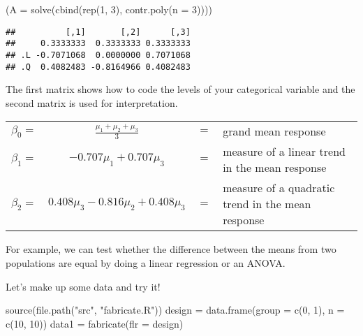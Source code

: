 \documentclass[
]{book}
\newenvironment{Shaded}{\begin{snugshade}}{\end{snugshade}}
\newcommand{\AttributeTok}[1]{\textcolor[rgb]{0.77,0.63,0.00}{#1}}
\newcommand{\DecValTok}[1]{\textcolor[rgb]{0.00,0.00,0.81}{#1}}
\newcommand{\FunctionTok}[1]{\textcolor[rgb]{0.00,0.00,0.00}{#1}}
\newcommand{\NormalTok}[1]{#1}
\newcommand{\OtherTok}[1]{\textcolor[rgb]{0.56,0.35,0.01}{#1}}
\newcommand{\StringTok}[1]{\textcolor[rgb]{0.31,0.60,0.02}{#1}}
\begin{document}
\begin{Shaded}
\begin{Highlighting}[]
\NormalTok{(}\AttributeTok{A =} \FunctionTok{solve}\NormalTok{(}\FunctionTok{cbind}\NormalTok{(}\FunctionTok{rep}\NormalTok{(}\DecValTok{1}\NormalTok{, }\DecValTok{3}\NormalTok{), }\FunctionTok{contr.poly}\NormalTok{(}\AttributeTok{n =} \DecValTok{3}\NormalTok{))))}
\end{Highlighting}
\end{Shaded}

\begin{verbatim}
##          [,1]       [,2]      [,3]
##     0.3333333  0.3333333 0.3333333
## .L -0.7071068  0.0000000 0.7071068
## .Q  0.4082483 -0.8164966 0.4082483
\end{verbatim}

The first matrix shows how to code the levels of your categorical
variable and the second matrix is used for interpretation.

\begin{tabularx}{\textwidth}{r c c X}
\(\beta_0 =\) &\(\tfrac{\mu_1+\mu_2+\mu_3}{3}\) &\(=\) &grand mean response \\
\(\beta_1 =\) &\(-0.707\mu_1 + 0.707\mu_3\) &\(=\) &measure of a linear trend in the mean response \\
\(\beta_2 =\) &\(0.408 \mu_3 - 0.816 \mu_2 + 0.408 \mu_3\) &\(=\) &measure of a quadratic trend in the mean response
\end{tabularx}

For example, we can test whether the difference between the means from
two populations are equal by doing a linear regression or an ANOVA.

Let's make up some data and try it!

\begin{Shaded}
\begin{Highlighting}[]
\FunctionTok{source}\NormalTok{(}\FunctionTok{file.path}\NormalTok{(}\StringTok{"src"}\NormalTok{, }\StringTok{"fabricate.R"}\NormalTok{))}
\NormalTok{design }\OtherTok{=} \FunctionTok{data.frame}\NormalTok{(}\AttributeTok{group =} \FunctionTok{c}\NormalTok{(}\DecValTok{0}\NormalTok{, }\DecValTok{1}\NormalTok{), }\AttributeTok{n =} \FunctionTok{c}\NormalTok{(}\DecValTok{10}\NormalTok{, }\DecValTok{10}\NormalTok{))}
\NormalTok{data1 }\OtherTok{=} \FunctionTok{fabricate}\NormalTok{(}\AttributeTok{flr =}\NormalTok{ design)}
\end{Highlighting}
\end{Shaded}
\end{document}
